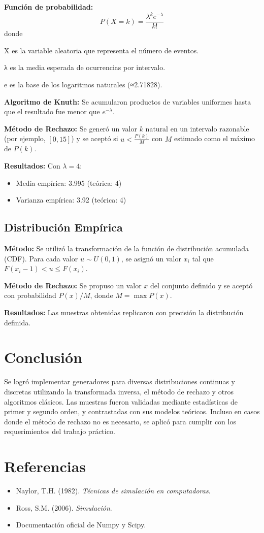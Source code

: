 \documentclass{article}
\begin{document}
\textbf{Función de probabilidad:}
\begin{equation}
P(X = k) = \frac{\lambda^k e^{-\lambda}}{k!}
\end{equation}
donde
\item X es la variable aleatoria que representa el número de eventos.
\item λ es la media esperada de ocurrencias por intervalo.
\item e es la base de los logaritmos naturales (≈2.71828).

\textbf{Algoritmo de Knuth:} Se acumularon productos de variables uniformes hasta que el resultado fue menor que $e^{-\lambda}$.

\textbf{Método de Rechazo:} Se generó un valor $k$ natural en un intervalo razonable (por ejemplo, $[0,15]$) y se aceptó si $u < \frac{P(k)}{M}$ con $M$ estimado como el máximo de $P(k)$.

\textbf{Resultados:} Con $\lambda=4$:
\begin{itemize}
\item Media empírica: 3.995 (teórica: 4)
\item Varianza empírica: 3.92 (teórica: 4)
\end{itemize}

\subsection{Distribución Empírica}
\textbf{Método:} Se utilizó la transformación de la función de distribución acumulada (CDF). Para cada valor $u \sim U(0,1)$, se asignó un valor $x_i$ tal que $F(x_i-1) < u \leq F(x_i)$.

\textbf{Método de Rechazo:} Se propuso un valor $x$ del conjunto definido y se aceptó con probabilidad $P(x)/M$, donde $M = \max P(x)$.

\textbf{Resultados:} Las muestras obtenidas replicaron con precisión la distribución definida.

\section{Conclusión}
Se logró implementar generadores para diversas distribuciones continuas y discretas utilizando la transformada inversa, el método de rechazo y otros algoritmos clásicos. Las muestras fueron validadas mediante estadísticas de primer y segundo orden, y contrastadas con sus modelos teóricos. Incluso en casos donde el método de rechazo no es necesario, se aplicó para cumplir con los requerimientos del trabajo práctico.

\section*{Referencias}
\begin{itemize}
\item Naylor, T.H. (1982). \textit{Técnicas de simulación en computadoras}.
\item Ross, S.M. (2006). \textit{Simulación}.
\item Documentación oficial de Numpy y Scipy.
\end{itemize}
\end{document}
